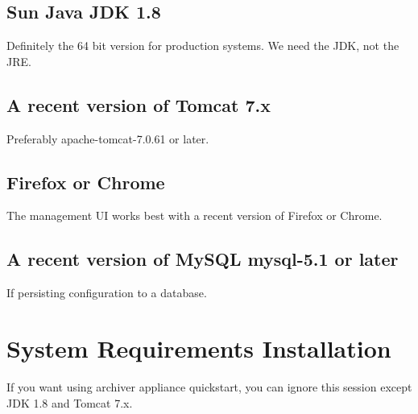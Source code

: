 \documentclass[11pt
  , a4paper
  , article
  , oneside
]{memoir}
\begin{document}
\subsection{Sun Java JDK 1.8}
Definitely the 64 bit version for production systems. We need the JDK, not the JRE.
\subsection{A recent version of Tomcat 7.x}
Preferably apache-tomcat-7.0.61 or later.
\subsection{Firefox or Chrome}
The management UI works best with a recent version of Firefox or Chrome.
\subsection{A recent version of MySQL mysql-5.1 or later}
If persisting configuration to a database.
\section{System Requirements Installation}
If you want using archiver appliance quickstart, you can ignore this session except JDK 1.8 and Tomcat 7.x.
\end{document}
